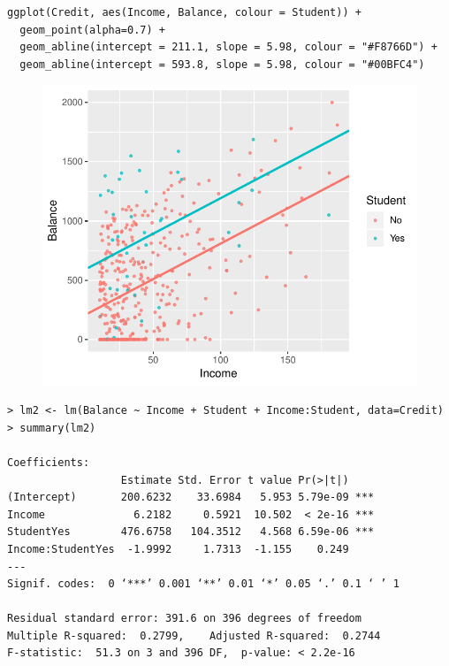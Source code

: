 \documentclass[10pt]{beamer}\usepackage[]{graphicx}\usepackage[]{color}
\begin{document}
\begin{frame}[fragile]
\small
\begin{verbatim}
ggplot(Credit, aes(Income, Balance, colour = Student)) +
  geom_point(alpha=0.7) +
  geom_abline(intercept = 211.1, slope = 5.98, colour = "#F8766D") +
  geom_abline(intercept = 593.8, slope = 5.98, colour = "#00BFC4")
\end{verbatim}
\begin{figure}
\includegraphics[scale=0.6]{figure/balance_parallel.pdf}
\end{figure}
\end{frame}

\begin{frame}[fragile]
\small
\begin{verbatim}
> lm2 <- lm(Balance ~ Income + Student + Income:Student, data=Credit)
> summary(lm2)

Coefficients:
                  Estimate Std. Error t value Pr(>|t|)    
(Intercept)       200.6232    33.6984   5.953 5.79e-09 ***
Income              6.2182     0.5921  10.502  < 2e-16 ***
StudentYes        476.6758   104.3512   4.568 6.59e-06 ***
Income:StudentYes  -1.9992     1.7313  -1.155    0.249    
---
Signif. codes:  0 ‘***’ 0.001 ‘**’ 0.01 ‘*’ 0.05 ‘.’ 0.1 ‘ ’ 1

Residual standard error: 391.6 on 396 degrees of freedom
Multiple R-squared:  0.2799,	Adjusted R-squared:  0.2744 
F-statistic:  51.3 on 3 and 396 DF,  p-value: < 2.2e-16
\end{verbatim}
\end{frame}
\end{document}
